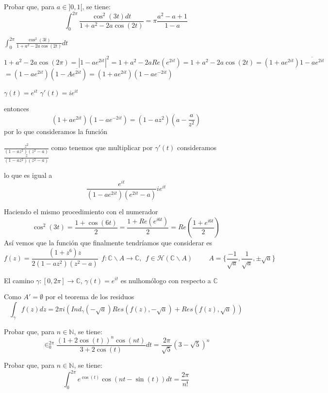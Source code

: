 \begin{ejer}
	Probar que, para $a\in]0,1[$, se tiene:
	$$ \int_0^{2\pi} \frac{\cos^2(3t)dt}{1+a^2-2a\cos(2t)} = \pi\frac{a^2-a+1}{1-a} $$
\end{ejer}

\begin{sol}

$\int_{0}^{2\pi} \frac{\cos^2(3t)}{1+a^2-2a\cos(2t)} dt$

$1+a^2-2a\cos(2\pi) = |1-ae^{2it}|^2 = 1+a^2-2aRe(e^{2it}) =  1+a^2-2a\cos(2t) = (1+ae^{2it})\overline{1-ae^{2it}}$
$= (1-ae^{2it})(1-A\overline{e^{2it}}) = (1+ae^{2it})(1-ae^{-2it})$

$\gamma(t) = e^{it}$
$\gamma'(t) = ie^{it}$

entonces
$$(1+ae^{2it})(1-ae^{-2it}) = (1-az^2)(a-\frac{a}{z^2})$$
por lo que consideramos la función 

$\frac{z^2}{(1-az^2)(z^2-a)}$ 
como tenemos que multiplicar por $\gamma'(t)$ consideramos $\frac{z}{(1-az^2)(z^2-a)}$

lo que es igual a
$$\frac{e^{it}}{(1-ae^{2it})(e^{2it}-a)} ie^{it}$$

Haciendo el mismo procedimiento con el numerador
$$\cos^2(3t) = \frac{1+\cos(6t)}{2} = \frac{1+Re(e^{i6t})}{2} = Re(\frac{1+e^{i6t}}{2})$$
Así vemos que la función que finalmente tendríamos que considerar es
$$f(z) = \frac{(1+z^6)z}{2(1-az^2)(z^2-a)} \ \ f:\mathbb{C}\backslash A \rightarrow \mathbb{C}, \ \ f\in\mathcal{H}(\mathbb{C}\backslash A) \hspace{1cm} A = \{ \frac{-1}{\sqrt{a}}, \frac{1}{\sqrt{a}}, \pm\sqrt{a} \}$$

El camino $\gamma:[0,2\pi] \rightarrow \mathbb{C}$, $\gamma(t) = e^{it}$ es nulhomólogo con respecto a $\mathbb{C}$

Como $A' = \emptyset$ por el teorema de los residuos
$$\int_{\gamma} f(z)dz = 2\pi i \left( Ind_{\gamma}(-\sqrt{a})Res(f(z),-\sqrt{a}) + Res(f(z), \sqrt{a}) \right)$$
\end{sol}

\begin{ejer}
	Probar que, para $n\in\mathbb{N}$, se tiene:
	$$ \in_0^{2\pi} \frac{(1+2\cos(t))^n \cos(nt)}{3+2\cos(t)} dt = \frac{2\pi}{\sqrt{5}} (3-\sqrt{5})^n $$
\end{ejer}


\begin{ejer}
	Probar que, para $n\in\mathbb{N}$, se tiene:
	$$ \int_{0}^{2\pi} e^{\cos(t)} \cos(nt-\sin(t))dt = \frac{2\pi}{n!} $$
\end{ejer}


